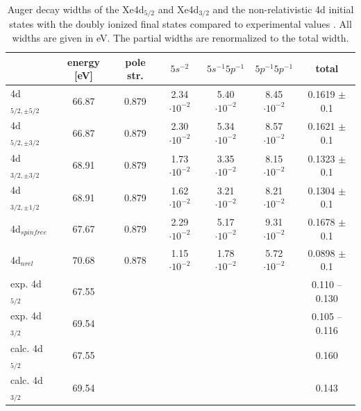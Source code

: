 \begin{table}[h]
 \centering
 \small
 \caption{Auger decay widths of the Xe4d$_{5/2}$ and Xe4d$_{3/2}$
          and the non-relativistic
          4d initial states with the doubly ionized final states
          compared to experimental values \cite{Ausmees99}.
          All widths are given in \unit{eV}.
          The partial widths are renormalized to the total width.}
 \begin{tabular}{lcccccc}
   \toprule
               & energy [\unit{eV}] & pole str. & $5s^{-2}$          & $5s^{-1}5p^{-1}$   & $5p^{-1}5p^{-1}$   & total \\
   \midrule                                                                                     
     4d$_{5/2,\pm 5/2}$ &  66.87    &   0.879       & 2.34$\cdot10^{-2}$ & 5.40$\cdot10^{-2}$ & 8.45$\cdot10^{-2}$ & 0.1619 $\pm$ 0.1\\
     4d$_{5/2,\pm 3/2}$ &  66.87    &   0.879       & 2.30$\cdot10^{-2}$ & 5.34$\cdot10^{-2}$ & 8.57$\cdot10^{-2}$ & 0.1621 $\pm$ 0.1\\
     4d$_{3/2,\pm 3/2}$ &  68.91    &   0.879       & 1.73$\cdot10^{-2}$ & 3.35$\cdot10^{-2}$ & 8.15$\cdot10^{-2}$ & 0.1323 $\pm$ 0.1\\
     4d$_{3/2,\pm 1/2}$ &  68.91    &   0.879       & 1.62$\cdot10^{-2}$ & 3.21$\cdot10^{-2}$ & 8.21$\cdot10^{-2}$ & 0.1304 $\pm$ 0.1\\
     4d$_{spinfree}$    &  67.67    &   0.879       & 2.29$\cdot10^{-2}$ & 5.17$\cdot10^{-2}$ & 9.31$\cdot10^{-2}$ & 0.1678 $\pm$ 0.1\\
     4d$_{nrel}$        &  70.68    &   0.878       & 1.15$\cdot10^{-2}$ & 1.78$\cdot10^{-2}$ & 5.72$\cdot10^{-2}$ & 0.0898 $\pm$ 0.1\\
     \midrule
     exp. 4d$_{5/2}$    &  67.55 \cite{King77}   &      &       &   &    & 0.110 -- 0.130 \cite{Ausmees99} \\
     exp. 4d$_{3/2}$    &  69.54 \cite{King77}   &      &       &   &    & 0.105 -- 0.116 \cite{Ausmees99} \\
     calc. 4d$_{5/2}$  &67.55\cite{Maentykenttae93}&    &       &   &    & 0.160 \cite{Maentykenttae93} \\
     calc. 4d$_{3/2}$  &69.54\cite{Maentykenttae93}&    &       &   &    & 0.143 \cite{Maentykenttae93} \\
   \bottomrule                                                                                 
 \end{tabular}                                                                                 
 \label{table:xe_auger_4d_rates}
\end{table}


